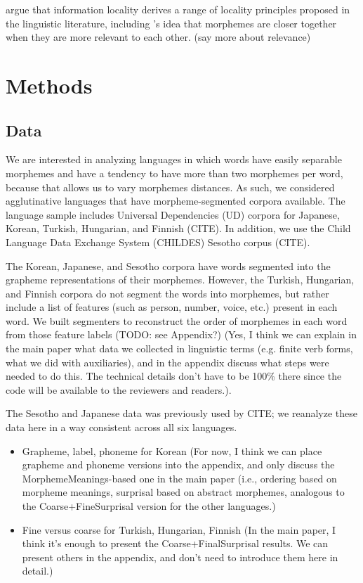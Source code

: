 \documentclass[11pt,letterpaper]{article}
\newcommand\mhahn[1]{{\color{red}(#1)}}
\newcommand\becky[1]{{\color{blue}(#1)}}
\begin{document}
\citet{Hahn2020modeling} argue that information locality derives a range of locality principles proposed in the linguistic literature, including \cite{bybee-morphology-1985}'s idea that morphemes are closer together when they are more relevant to each other.
\mhahn{say more about relevance}

\section{Methods}

\subsection{Data} %

We are interested in analyzing languages in which words have easily separable morphemes and have a tendency to have more than two morphemes per word, because that allows us to vary morphemes distances. As such, we considered agglutinative languages that have morpheme-segmented corpora available. The language sample includes Universal Dependencies (UD) corpora for Japanese, Korean, Turkish, Hungarian, and Finnish (CITE). In addition, we use the Child Language Data Exchange System (CHILDES) Sesotho corpus (CITE). 

The Korean, Japanese, and Sesotho corpora have words segmented into the grapheme representations of their morphemes. However, the Turkish, Hungarian, and Finnish corpora do not segment the words into morphemes, but rather include a list of features (such as person, number, voice, etc.) present in each word. We built segmenters to reconstruct the order of morphemes in each word from those feature labels \becky{TODO: see Appendix?} \mhahn{Yes, I think we can explain in the main paper what data we collected in linguistic terms (e.g. finite verb forms, what we did with auxiliaries), and in the appendix discuss what steps were needed to do this. The technical details don't have to be 100\% there since the code will be available to the reviewers and readers.}.

The Sesotho and Japanese data was previously used by CITE; we reanalyze these data here in a way consistent across all six languages.

\begin{itemize}
    \item Grapheme, label, phoneme for Korean \mhahn{For now, I think we can place grapheme and phoneme versions into the appendix, and only discuss the MorphemeMeanings-based one in the main paper (i.e., ordering based on morpheme meanings, surprisal based on abstract morphemes, analogous to the Coarse+FineSurprisal version for the other languages.}
    \item Fine versus coarse for Turkish, Hungarian, Finnish \mhahn{In the main paper, I think it's enough to present the Coarse+FinalSurprisal results. We can present others in the appendix, and don't need to introduce them here in detail.}
\end{itemize}
\end{document}
